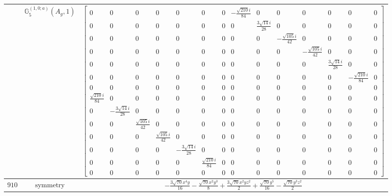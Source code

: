\documentclass[fleqn,8pt,landscape]{jsarticle}
\begin{document}
\begin{longtable}{ccc}
$  $ & $ \mathbb{G}_{5}^{(1,0;a)}(A_{g},1) $ & $ \begin{bmatrix} 0 & 0 & 0 & 0 & 0 & 0 & 0 & - \frac{\sqrt{210} i}{84} & 0 & 0 & 0 & 0 & 0 & 0 \\ 0 & 0 & 0 & 0 & 0 & 0 & 0 & 0 & \frac{3 \sqrt{14} i}{28} & 0 & 0 & 0 & 0 & 0 \\ 0 & 0 & 0 & 0 & 0 & 0 & 0 & 0 & 0 & - \frac{\sqrt{105} i}{42} & 0 & 0 & 0 & 0 \\ 0 & 0 & 0 & 0 & 0 & 0 & 0 & 0 & 0 & 0 & - \frac{\sqrt{105} i}{42} & 0 & 0 & 0 \\ 0 & 0 & 0 & 0 & 0 & 0 & 0 & 0 & 0 & 0 & 0 & \frac{3 \sqrt{14} i}{28} & 0 & 0 \\ 0 & 0 & 0 & 0 & 0 & 0 & 0 & 0 & 0 & 0 & 0 & 0 & - \frac{\sqrt{210} i}{84} & 0 \\ 0 & 0 & 0 & 0 & 0 & 0 & 0 & 0 & 0 & 0 & 0 & 0 & 0 & 0 \\ \frac{\sqrt{210} i}{84} & 0 & 0 & 0 & 0 & 0 & 0 & 0 & 0 & 0 & 0 & 0 & 0 & 0 \\ 0 & - \frac{3 \sqrt{14} i}{28} & 0 & 0 & 0 & 0 & 0 & 0 & 0 & 0 & 0 & 0 & 0 & 0 \\ 0 & 0 & \frac{\sqrt{105} i}{42} & 0 & 0 & 0 & 0 & 0 & 0 & 0 & 0 & 0 & 0 & 0 \\ 0 & 0 & 0 & \frac{\sqrt{105} i}{42} & 0 & 0 & 0 & 0 & 0 & 0 & 0 & 0 & 0 & 0 \\ 0 & 0 & 0 & 0 & - \frac{3 \sqrt{14} i}{28} & 0 & 0 & 0 & 0 & 0 & 0 & 0 & 0 & 0 \\ 0 & 0 & 0 & 0 & 0 & \frac{\sqrt{210} i}{84} & 0 & 0 & 0 & 0 & 0 & 0 & 0 & 0 \\ 0 & 0 & 0 & 0 & 0 & 0 & 0 & 0 & 0 & 0 & 0 & 0 & 0 & 0 \end{bmatrix} $ \\ \hline
$ 910 $ & $ \text{symmetry} $ & $ - \frac{3 \sqrt{70} x^{4} y}{16} - \frac{\sqrt{70} x^{2} y^{3}}{8} + \frac{3 \sqrt{70} x^{2} y z^{2}}{2} + \frac{\sqrt{70} y^{5}}{16} - \frac{\sqrt{70} y^{3} z^{2}}{2} $ \\

\end{longtable}
\end{document}
